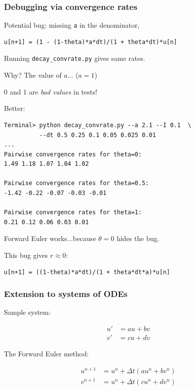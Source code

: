 \documentclass{beamer}
\begin{document}
\begin{frame}
\frametitle{Debugging via convergence rates}

Potential bug: missing \texttt{a} in the denominator,

\begin{verbatim}
u[n+1] = (1 - (1-theta)*a*dt)/(1 + theta*dt)*u[n]
\end{verbatim}
Running \Verb!decay_convrate.py! gives same rates.

Why? The value of $a$... ($a=1$)

0 and 1 are \emph{bad values} in tests!

Better:
\begin{verbatim}
Terminal> python decay_convrate.py --a 2.1 --I 0.1  \ 
          --dt 0.5 0.25 0.1 0.05 0.025 0.01
...
Pairwise convergence rates for theta=0:
1.49 1.18 1.07 1.04 1.02

Pairwise convergence rates for theta=0.5:
-1.42 -0.22 -0.07 -0.03 -0.01

Pairwise convergence rates for theta=1:
0.21 0.12 0.06 0.03 0.01
\end{verbatim}

Forward Euler works...because $\theta=0$ hides the bug.

This bug gives $r\approx 0$:

\begin{verbatim}
u[n+1] = ((1-theta)*a*dt)/(1 + theta*dt*a)*u[n]
\end{verbatim}
\end{frame}

\begin{frame}
\frametitle{Extension to systems of ODEs}

Sample system:

\begin{align}
u' &= a u + bv\\ 
v' &= cu +  dv
\end{align}

The Forward Euler method:

\begin{align}
u^{n+1} &= u^n + \Delta t (a u^n + b v^n)\\ 
v^{n+1} &= u^n + \Delta t (cu^n + dv^n)
\end{align}
\end{frame}
\end{document}

